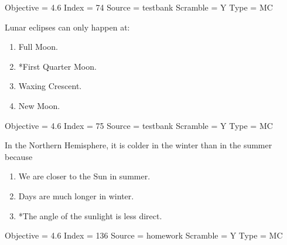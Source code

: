 \documentclass[11pt]{article}
\begin{document}
\begin{enumerate}
\begin{minipage}{\textwidth}
\begin{minipage}{\textwidth}
Objective = 4.6
Index = 74
Source = testbank
Scramble = Y
Type = MC
\end{minipage}
\end{minipage}
\vskip 0.20in

\begin{minipage}{\textwidth}
\begin{minipage}{\textwidth}
\item Lunar eclipses can only happen at:
\begin{multicols}{3}
\begin{enumerate} 
\setlength{\itemsep}{1pt} 
\setlength{\parskip}{0pt} 
\setlength{\parsep}{0pt}
\setlength{\multicolsep}{1pt} 
\item Full Moon.
\item *First Quarter Moon.
\item Waxing Crescent.
\item New Moon.
\end{enumerate} 
\vfill 
\end{multicols}

Objective = 4.6
Index = 75
Source = testbank
Scramble = Y
Type = MC
\end{minipage}
\end{minipage}
\vskip 0.20in

\begin{minipage}{\textwidth}
\begin{minipage}{\textwidth}
\item In the Northern Hemisphere, it is colder in the winter than in the summer because \underline{\hspace{0.5in}}
\begin{enumerate} 
\setlength{\itemsep}{1pt} 
\setlength{\parskip}{0pt} 
\setlength{\parsep}{0pt}
\setlength{\multicolsep}{1pt} 
\item We are closer to the Sun in summer.
\item Days are much longer in winter.
\item *The angle of the sunlight is less direct.
\end{enumerate} 
Objective = 4.6
Index = 136
Source = homework
Scramble = Y
Type = MC
\end{minipage}
\end{minipage}
\vskip 0.20in


\end{enumerate}
\end{document}
